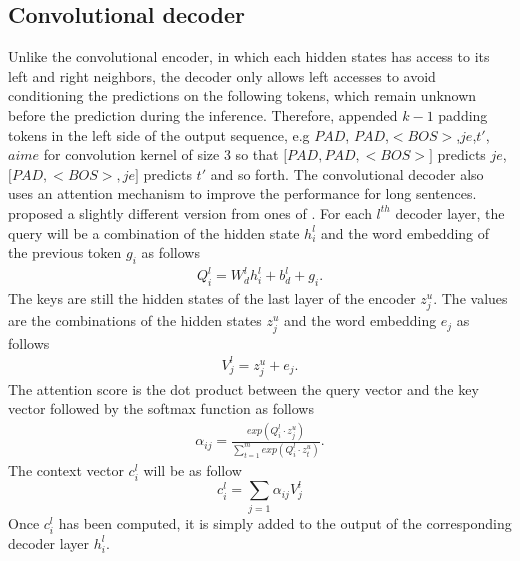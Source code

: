 \subsection{Convolutional decoder}
Unlike the convolutional encoder, in which each hidden states has access to its left and right neighbors, the decoder only allows left accesses to avoid conditioning the predictions on the following tokens, which remain unknown before the prediction during the inference. Therefore, \citet{Ghering17convolutional} appended $k-1$ padding tokens in the left side of the output sequence, e.g $PAD$, $PAD$,$ <BOS>$,$je$,$t'$,$aime$ for convolution kernel of size 3 so that $\big[ PAD, PAD, <BOS>\big]$ predicts $je$, $\big[ PAD,<BOS>,je\big]$ predicts $t'$ and so forth.
The convolutional decoder also uses an attention mechanism to improve the performance for long sentences. \citet{Ghering17convolutional} proposed a slightly different version from ones of \citet{Luong15stanford, Bahdanau15learning}. For each $l^{th}$ decoder layer, the query will be a combination of the hidden state $h^l_i$ and the word embedding of the previous token $g_i$ as follows
\begin{equation}
\begin{array}{rcl}
Q^l_i = W^l_d h^l_i + b^l_d + g_i.
\end{array}
\end{equation}
The keys are still the hidden states of the last layer of the encoder $z^u_j$. The values are the combinations of the hidden states $z^u_j$ and the word embedding $e_j$ as follows
\begin{equation}
\begin{array}{rcl}
V^l_j = z^u_j + e_j.
\end{array}
\end{equation}
The attention score is the dot product between the query vector and the key vector followed by the softmax function as follows
\begin{equation}
\begin{array}{rcl}
\alpha_{ij}=\frac{exp(Q^l_i \cdot z^u_j)}{\sum_{t=1}^m exp(Q^l_i \cdot z^u_t)}.
\end{array}
\end{equation}
The context vector $c^l_i$ will be as follow
\begin{equation}
c^l_i = \sum_{j=1}\alpha_{ij}V^l_j
\end{equation}
Once $c^l_i$ has been computed, it is simply added to the output of the corresponding decoder layer $h^l_i$.
